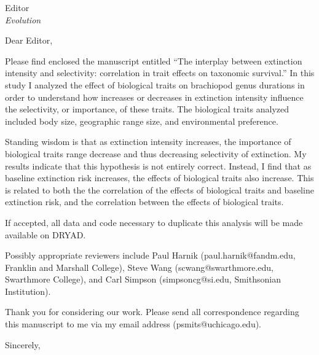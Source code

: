 \documentclass{letter}
\begin{document}
\begin{letter}{Editor \\ \textit{Evolution}}
  \opening{Dear Editor,}

  Please find enclosed the manuscript entitled ``The interplay between extinction intensity and selectivity: correlation in trait effects on taxonomic survival.'' In this study I analyzed the effect of biological traits on brachiopod genus durations in order to understand how increases or decreases in extinction intensity influence the selectivity, or importance, of these traits. The biological traits analyzed included body size, geographic range size, and environmental preference.
  
  Standing wisdom is that as extinction intensity increases, the importance of biological traits range decrease and thus decreasing selectivity of extinction. My results indicate that this hypothesis is not entirely correct. Instead, I find that as baseline extinction risk increases, the effects of biological traits also increase. This is related to both the the correlation of the effects of biological traits and baseline extinction risk, and the correlation between the effects of biological traits.
  
  If accepted, all data and code necessary to duplicate this analysis will be made available on DRYAD.

  Possibly appropriate reviewers include Paul Harnik (paul.harnik@fandm.edu, Franklin and Marshall College), Steve Wang (scwang@swarthmore.edu, Swarthmore College), and Carl Simpson (simpsoncg@si.edu, Smithsonian Institution).
  
  Thank you for considering our work. Please send all correspondence regarding this manuscript to me via my email address (psmits@uchicago.edu).

  \closing{Sincerely,}


\end{letter}
\end{document}
